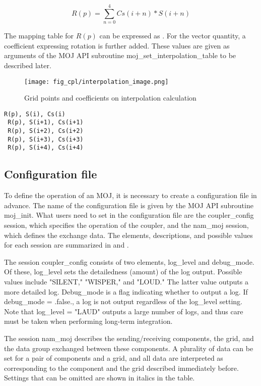 \[R(p) = \sum_{n=0}^{4} Cs(i+n)*S(i+n)\]

The mapping table for \(R(p)\) can be expressed as . For the vector
quantity, a coefficient expressing rotation is further added. These
values are given as arguments of the MOJ API subroutine
moj\_set\_interpolation\_table to be described later.

\begin{figure}
\hypertarget{fig:interpolation_image}{%
\centering
\texttt{[image: fig\_cpl/interpolation\_image.png]}
\caption{Grid points and coefficients on interpolation
calculation}\label{fig:interpolation_image}
}
\end{figure}

\hypertarget{list:mapping_table_sample}{%
\label{list:mapping_table_sample}}%
\begin{verbatim}
R(p), S(i), Cs(i)
 R(p), S(i+1), Cs(i+1)
 R(p), S(i+2), Cs(i+2)
 R(p), S(i+3), Cs(i+3)
 R(p), S(i+4), Cs(i+4)
\end{verbatim}

\hypertarget{configuration-file}{%
\subsection{Configuration file}\label{configuration-file}}

To define the operation of an MOJ, it is necessary to create a
configuration file in advance. The name of the configuration file is
given by the MOJ API subroutine moj\_init. What users need to set in the
configuration file are the coupler\_config session, which specifies the
operation of the coupler, and the nam\_moj session, which defines the
exchange data. The elements, descriptions, and possible values for each
session are summarized in and .

The session coupler\_config consists of two elements, log\_level and
debug\_mode. Of these, log\_level sets the detailedness (amount) of the
log output. Possible values include "SILENT," "WISPER," and "LOUD." The
latter value outputs a more detailed log. Debug\_mode is a flag
indicating whether to output a log. If debug\_mode = .false., a log is
not output regardless of the log\_level setting. Note that log\_level =
"LAUD" outputs a large number of logs, and thus care must be taken when
performing long-term integration.

The session nam\_moj describes the sending/receiving components, the
grid, and the data group exchanged between these components. A plurality
of data can be set for a pair of components and a grid, and all data are
interpreted as corresponding to the component and the grid described
immediately before. Settings that can be omitted are shown in italics in
the table.

